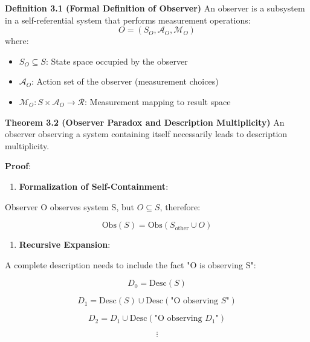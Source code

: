 \textbf{Definition 3.1 (Formal Definition of Observer)}
\label{def:3.1}
An observer is a subsystem in a self-referential system that performs measurement operations:
\begin{equation}
O = (S_O, \mathcal{A}_O, \mathcal{M}_O)
\end{equation}
where:
\begin{itemize}
\item $S_O \subseteq S$: State space occupied by the observer
\item $\mathcal{A}_O$: Action set of the observer (measurement choices)
\item $\mathcal{M}_O: S \times \mathcal{A}_O \to \mathcal{R}$: Measurement mapping to result space
\end{itemize}

\textbf{Theorem 3.2 (Observer Paradox and Description Multiplicity)}
\label{thm:3.2}
An observer observing a system containing itself necessarily leads to description multiplicity.

\textbf{Proof}:

\begin{enumerate}
\item \textbf{Formalization of Self-Containment}:
\end{enumerate}
   Observer O observes system S, but $O \subseteq S$, therefore:
   
\begin{equation}
\text{Obs}(S) = \text{Obs}(S_{\text{other}} \cup O)
\end{equation}

\begin{enumerate}
\item \textbf{Recursive Expansion}:
\end{enumerate}
   A complete description needs to include the fact "O is observing S":
   
\begin{equation}
D_0 = \text{Desc}(S)
\end{equation}
   
\begin{equation}
D_1 = \text{Desc}(S) \cup \text{Desc}(\text{"O observing } S\text{"})
\end{equation}
   
\begin{equation}
D_2 = D_1 \cup \text{Desc}(\text{"O observing } D_1\text{"})
\end{equation}
   
\begin{equation}
\vdots
\end{equation}

